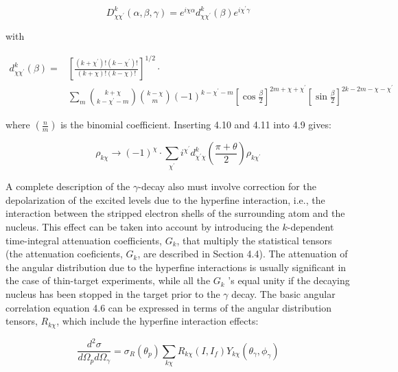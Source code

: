 \documentclass[10pt]{article}
\begin{document}
\begin{equation*}
D_{\chi \chi^{\prime}}^{k}(\alpha, \beta, \gamma)=e^{i \chi \alpha} d_{\chi \chi^{\prime}}^{k}(\beta) e^{i \chi^{\prime} \gamma} \tag{4.12}
\end{equation*}


with


\begin{align*}
d_{\chi \chi^{\prime}}^{k}(\beta)= & {\left[\frac{\left(k+\chi^{\prime}\right)!\left(k-\chi^{\prime}\right)!}{(k+\chi)!(k-\chi)!}\right]^{1 / 2} \cdot }  \tag{4.13}\\
& \sum_{m}\binom{k+\chi}{k-\chi^{\prime}-m}\binom{k-\chi}{m}(-1)^{k-\chi^{\prime}-m}\left[\cos \frac{\beta}{2}\right]^{2 m+\chi+\chi^{\prime}}\left[\sin \frac{\beta}{2}\right]^{2 k-2 m-\chi-\chi^{\prime}}
\end{align*}


where $\left(\frac{n}{m}\right)$ is the binomial coefficient. Inserting 4.10 and 4.11 into 4.9 gives:


\begin{equation*}
\rho_{k \chi} \rightarrow(-1)^{\chi} \cdot \sum_{\chi^{\prime}} i^{\chi^{\prime}} d_{\chi^{\prime} \chi}^{k}\left(\frac{\pi+\theta}{2}\right) \rho_{k \chi^{\prime}} \tag{4.14}
\end{equation*}


A complete description of the $\gamma$-decay also must involve correction for the depolarization of the excited levels due to the hyperfine interaction, i.e., the interaction between the stripped electron shells of the surrounding atom and the nucleus. This effect can be taken into account by introducing the $k$-dependent time-integral attenuation coefficients, $G_{k}$, that multiply the statistical tensors (the attenuation coeficients, $G_{k}$, are described in Section 4.4). The attenuation of the angular distribution due to the hyperfine interactions is usually significant in the case of thin-target experiments, while all the $G_{k}$ 's equal unity if the decaying nucleus has been stopped in the target prior to the $\gamma$ decay. The basic angular correlation equation 4.6 can be expressed in terms of the angular distribution tensors, $R_{k \chi}$, which include the hyperfine interaction effects:


\begin{equation*}
\frac{d^{2} \sigma}{d \Omega_{p} d \Omega_{\gamma}}=\sigma_{R}\left(\theta_{p}\right) \sum_{k \chi} R_{k \chi}\left(I, I_{f}\right) Y_{k \chi}\left(\theta_{\gamma}, \phi_{\gamma}\right) \tag{4.15}
\end{equation*}
\end{document}
